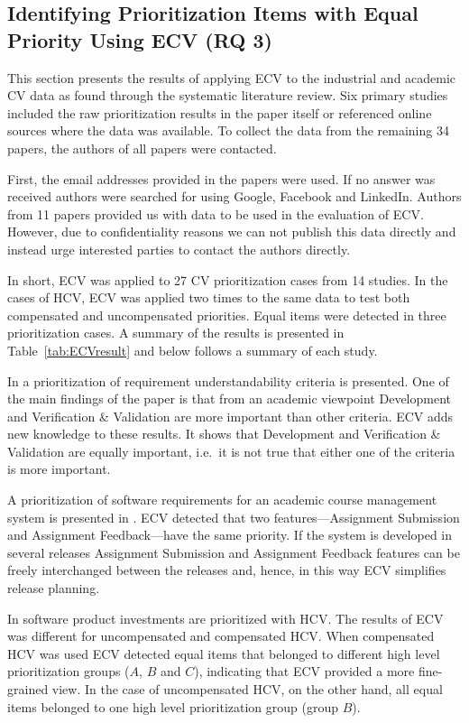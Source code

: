 \subsection{\label{rq3}Identifying Prioritization Items with Equal Priority Using ECV (RQ 3)}
This section presents the results of applying ECV to the industrial and academic CV data as found through the systematic literature review. Six primary studies included the raw prioritization results in the paper itself or referenced online sources where the data was available. To collect the data from the remaining 34 papers, the authors of all papers were contacted.

First, the email addresses provided in the papers were used. If no answer was received authors were searched for using Google, Facebook and LinkedIn. Authors from 11 papers provided us with data to be used in the evaluation of ECV. However, due to confidentiality reasons we can not publish this data directly and instead urge interested parties to contact the authors directly.

In short, ECV was applied to 27 CV prioritization cases from 14 studies.
In the cases of HCV, ECV was applied two times to the same data to test both compensated and uncompensated priorities. Equal items were detected in three prioritization cases. A summary of the results is presented in Table~\ref{tab:ECVresult} and below follows a summary of each study.

In \cite{Svahnberg2008} a prioritization of requirement understandability criteria is presented.
One of the main findings of the paper is that from an academic viewpoint Development and Verification \& Validation are more important than other criteria.
ECV adds new knowledge to these results.
It shows that Development and Verification \& Validation are equally important, i.e.\ it is not true that either one of the criteria is more important.

A prioritization of software requirements for an academic course management system is presented in \cite{Berander2009a}. ECV detected that two features---Assignment Submission and Assignment Feedback---have the same priority.
If the system is developed in several releases Assignment Submission and Assignment Feedback features can be freely interchanged between the releases and, hence, in this way ECV simplifies release planning.

In \cite{Barney2009} software product investments are prioritized with HCV.
The results of ECV was different for uncompensated and compensated HCV.
When compensated HCV was used ECV detected equal items that belonged to different high level prioritization groups ($A$, $B$ and $C$), indicating that ECV provided a more fine-grained view. In the case of uncompensated HCV, on the other hand, all equal items belonged to one high level prioritization group (group $B$).

